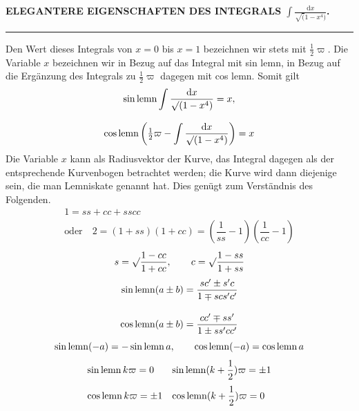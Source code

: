 \begingroup
\renewcommand{\arraystretch}{1.45}
\clearpage{}

\begin{center}
\textbf{ELEGANTERE EIGENSCHAFTEN DES INTEGRALS $\displaystyle\int\frac{\mathrm{d}x}{\surd(1-x^4)}$.}
\end{center}
\par\begin{center}\rule{.22\linewidth}{.3pt}\end{center}
Den Wert dieses Integrals von $x=0$ bis $x=1$ bezeichnen wir stets mit $\frac12\varpi$. Die Variable $x$ bezeichnen wir in Bezug auf das Integral mit sin lemn, in Bezug auf die Ergänzung des Integrals zu $\frac12\varpi$ dagegen mit cos lemn. Somit gilt
\[
\begin{gathered}\operatorname{sin\,lemn}\int\dfrac{\mathrm{d}x}{\surd(1-x^4)}=x,\\[8pt]
\operatorname{cos\,lemn}\left(\tfrac12\varpi-\int\dfrac{\mathrm{d}x}{\surd(1-x^4)}\right)=x\end{gathered}
\]
Die Variable $x$ kann als Radiusvektor der Kurve, das Integral dagegen als der entsprechende Kurvenbogen betrachtet werden; die Kurve wird dann diejenige sein, die man Lemniskate genannt hat. Dies genügt zum Verständnis des Folgenden.
\[
\begin{gathered}1=ss+cc+sscc\\[6pt]\text{oder}\quad
2=(1+ss)(1+cc)=\left(\dfrac1{ss}-1\right)\left(\dfrac1{cc}-1\right)\end{gathered}
\]
\[
s=\surd\dfrac{1-cc}{1+cc},\qquad c=\surd\dfrac{1-ss}{1+ss}
\]
\[
\begin{aligned}
\operatorname{sin\,lemn}(a\pm b)&=\dfrac{sc'\pm s'c}{1\mp scs'c'}\\[10pt]
\operatorname{cos\,lemn}(a\pm b)&=\dfrac{cc'\mp ss'}{1\pm ss'cc'}
\end{aligned}
\]
\[
\operatorname{sin\,lemn}(-a)=-\operatorname{sin\,lemn} a,\qquad \operatorname{cos\,lemn}(-a)=\operatorname{cos\,lemn} a
\]
\[
\begin{array}{ll}
\operatorname{sin\,lemn} k\varpi=0&\operatorname{sin\,lemn}(k+\dfrac12)\varpi=\pm1\\[10pt]
\operatorname{cos\,lemn} k\varpi=\pm1&\operatorname{cos\,lemn}(k+\dfrac12)\varpi=0
\end{array}
\]


